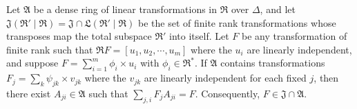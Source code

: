 Let $\mathfrak{A}$ be a dense ring of linear transformations in $\mathfrak{R}$ over $\Delta$, and let $\mathfrak{J}(\mathfrak{R}' \mid \mathfrak{R}) = \mathfrak{J} \cap \mathfrak{L}(\mathfrak{R}' \mid \mathfrak{R})$ be the set of finite rank transformations whose transposes map the total subspace $\mathfrak{R}'$ into itself. Let $F$ be any transformation of finite rank such that $\mathfrak{R}F = [u_1, u_2, \cdots, u_m]$ where the $u_i$ are linearly independent, and suppose $F = \sum_{i=1}^m \phi_i \times u_i$ with $\phi_i \in \mathfrak{R}^*$. If $\mathfrak{A}$ contains transformations $F_j = \sum_k \psi_{jk} \times v_{jk}$ where the $v_{jk}$ are linearly independent for each fixed $j$, then there exist $A_{ji} \in \mathfrak{A}$ such that $\sum_{j,i} F_j A_{ji} = F$. Consequently, $F \in \mathfrak{J} \cap \mathfrak{A}$.

